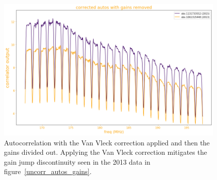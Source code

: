 \documentclass[11pt]{article}
\begin{document}
\begin{figure}
\centering{}
\includegraphics[width=140mm]{corr_autos_gains.png}
\caption{Autocorrelation with the Van Vleck correction applied and then the gains divided out. Applying the Van Vleck correction mitigates the gain jump discontinuity seen in the 2013 data in figure~\ref{uncorr_autos_gains}.\label{corr_autos_gains}}
\end{figure}
\end{document}
